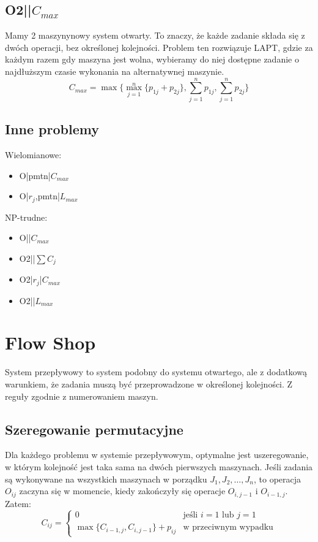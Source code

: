 \documentclass{../notatki}
\begin{document}
\subsection{O2||\texorpdfstring{$C_{max}$}{Cmax}}

Mamy 2 maszynynowy system otwarty. To znaczy, że każde zadanie składa się
z dwóch operacji, bez określonej kolejności. Problem ten rozwiązuje
LAPT, gdzie za każdym razem gdy maszyna jest wolna, wybieramy do niej
dostępne zadanie o najdłuższym czasie wykonania na alternatywnej maszynie.
$$
C_{max} = \max\{\max_{j=1}^{n}\{p_{1j} + p_{2j}\},
\sum_{j=1}^{n}p_{1j}, \sum_{j=1}^{n} p_{2j}\}
$$

\subsection{Inne problemy}

Wielomianowe:
\begin{itemize}
  \item O|pmtn|$C_{max}$
  \item O|$r_j$,pmtn|$L_{max}$
\end{itemize}
NP-trudne:
\begin{itemize}
  \item O||$C_{max}$
  \item O2||$\sum C_j$
  \item O2|$r_j$|$C_{max}$
  \item O2||$L_{max}$
\end{itemize}

\section{Flow Shop}

System przepływowy to system podobny do systemu otwartego, ale z dodatkową
warunkiem, że zadania muszą być przeprowadzone w określonej kolejności.
Z reguły zgodnie z numerowaniem maszyn.

\subsection{Szeregowanie permutacyjne}

Dla każdego problemu w systemie przepływowym, optymalne jest
uszeregowanie, w którym kolejność jest taka sama na dwóch pierwszych maszynach.
Jeśli zadania są wykonywane na wszystkich maszynach w porządku $J_1,
J_2, \ldots, J_n$, to operacja $O_{ij}$ zaczyna się w momencie, kiedy zakończyły
się operacje $O_{i,j-1}$ i $O_{i-1,j}$. Zatem:
$$
C_{ij} =
\begin{cases}
  0 & \text{jeśli } i = 1 \text{ lub } j = 1 \\
  \max\{C_{i-1,j}, C_{i,j-1}\} + p_{ij} & \text{w przeciwnym wypadku}
\end{cases}
$$
\end{document}
